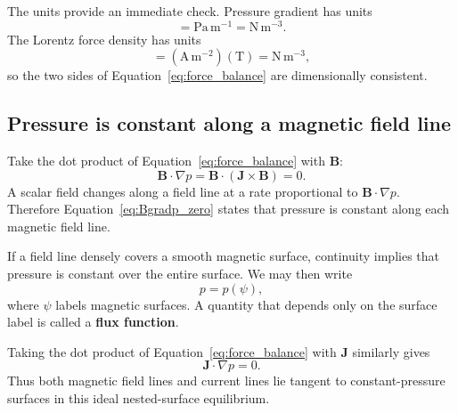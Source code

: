 The units provide an immediate check. Pressure gradient has units
\begin{equation}
[\nabla p]=\mathrm{Pa\,m^{-1}}=\mathrm{N\,m^{-3}}.
\end{equation}
The Lorentz force density has units
\begin{equation}
[\mathbf J\times\mathbf B]
=\left(\mathrm{A\,m^{-2}}\right)\left(\mathrm{T}\right)
=\mathrm{N\,m^{-3}},
\end{equation}
so the two sides of Equation~\eqref{eq:force_balance} are dimensionally consistent.

\subsection{Pressure is constant along a magnetic field line}
Take the dot product of Equation~\eqref{eq:force_balance} with $\mathbf B$:
\begin{equation}
\mathbf B\cdot\nabla p
=\mathbf B\cdot(\mathbf J\times\mathbf B)=0.
\label{eq:Bgradp_zero}
\end{equation}
A scalar field changes along a field line at a rate proportional to $\mathbf B\cdot\nabla p$. Therefore Equation~\eqref{eq:Bgradp_zero} states that pressure is constant along each magnetic field line.

If a field line densely covers a smooth magnetic surface, continuity implies that pressure is constant over the entire surface. We may then write
\begin{equation}
p=p(\psi),
\label{eq:p_flux_function}
\end{equation}
where $\psi$ labels magnetic surfaces. A quantity that depends only on the surface label is called a \textbf{flux function}.

Taking the dot product of Equation~\eqref{eq:force_balance} with $\mathbf J$ similarly gives
\begin{equation}
\mathbf J\cdot\nabla p=0.
\end{equation}
Thus both magnetic field lines and current lines lie tangent to constant-pressure surfaces in this ideal nested-surface equilibrium.

